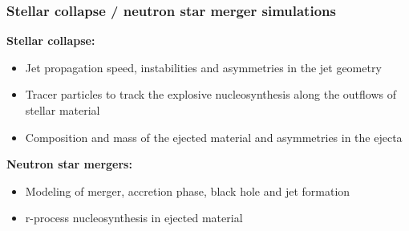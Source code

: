 \documentclass{beamer}
\begin{document}
\begin{frame}
\frametitle{Stellar collapse / neutron star merger simulations}
\begin{center}
\vspace{-0.5cm}
{\bf Stellar collapse:}
\begin{itemize}
\item Jet propagation speed, instabilities and asymmetries in the jet geometry 
\item Tracer particles to track the explosive nucleosynthesis along the outflows of stellar material
\item Composition and mass of the ejected material and asymmetries in the ejecta
\end{itemize}
\vspace{0.5cm}
{\bf Neutron star mergers:}
\begin{itemize}
\item Modeling of merger, accretion phase, black hole and jet formation
\item r-process nucleosynthesis in ejected material  
\end{itemize}
\end{center}
\end{frame}
\end{document}
